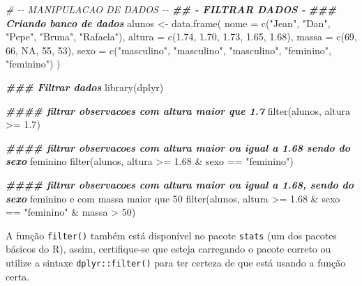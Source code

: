 \documentclass[
]{book}
\newenvironment{Shaded}{\begin{snugshade}}{\end{snugshade}}
\newcommand{\AttributeTok}[1]{\textcolor[rgb]{0.77,0.63,0.00}{#1}}
\newcommand{\CommentTok}[1]{\textcolor[rgb]{0.56,0.35,0.01}{\textit{#1}}}
\newcommand{\ConstantTok}[1]{\textcolor[rgb]{0.00,0.00,0.00}{#1}}
\newcommand{\DecValTok}[1]{\textcolor[rgb]{0.00,0.00,0.81}{#1}}
\newcommand{\DocumentationTok}[1]{\textcolor[rgb]{0.56,0.35,0.01}{\textbf{\textit{#1}}}}
\newcommand{\FloatTok}[1]{\textcolor[rgb]{0.00,0.00,0.81}{#1}}
\newcommand{\FunctionTok}[1]{\textcolor[rgb]{0.00,0.00,0.00}{#1}}
\newcommand{\NormalTok}[1]{#1}
\newcommand{\OtherTok}[1]{\textcolor[rgb]{0.56,0.35,0.01}{#1}}
\newcommand{\SpecialCharTok}[1]{\textcolor[rgb]{0.00,0.00,0.00}{#1}}
\newcommand{\StringTok}[1]{\textcolor[rgb]{0.31,0.60,0.02}{#1}}
\begin{document}
\begin{Shaded}
\begin{Highlighting}[]
\CommentTok{\# {-}{-} MANIPULACAO DE DADOS {-}{-}}
\DocumentationTok{\#\# {-} FILTRAR DADOS {-}}
\DocumentationTok{\#\#\# Criando banco de dados}
\NormalTok{alunos }\OtherTok{\textless{}{-}} \FunctionTok{data.frame}\NormalTok{(}
\AttributeTok{nome =} \FunctionTok{c}\NormalTok{(}\StringTok{"Jean"}\NormalTok{, }\StringTok{"Dan"}\NormalTok{, }\StringTok{"Pepe"}\NormalTok{, }\StringTok{"Bruna"}\NormalTok{, }\StringTok{"Rafaela"}\NormalTok{),}
\AttributeTok{altura =} \FunctionTok{c}\NormalTok{(}\FloatTok{1.74}\NormalTok{, }\FloatTok{1.70}\NormalTok{, }\FloatTok{1.73}\NormalTok{, }\FloatTok{1.65}\NormalTok{, }\FloatTok{1.68}\NormalTok{),}
\AttributeTok{massa =} \FunctionTok{c}\NormalTok{(}\DecValTok{69}\NormalTok{, }\DecValTok{66}\NormalTok{, }\ConstantTok{NA}\NormalTok{, }\DecValTok{55}\NormalTok{, }\DecValTok{53}\NormalTok{),}
\AttributeTok{sexo =} \FunctionTok{c}\NormalTok{(}\StringTok{"masculino"}\NormalTok{, }\StringTok{"masculino"}\NormalTok{, }\StringTok{"masculino"}\NormalTok{, }\StringTok{"feminino"}\NormalTok{, }\StringTok{"feminino"}\NormalTok{)}
\NormalTok{)}

\DocumentationTok{\#\#\# Filtrar dados}
\FunctionTok{library}\NormalTok{(dplyr)}

\DocumentationTok{\#\#\#\# filtrar observacoes com altura maior que 1.7}
\FunctionTok{filter}\NormalTok{(alunos, altura }\SpecialCharTok{\textgreater{}=} \FloatTok{1.7}\NormalTok{)}

\DocumentationTok{\#\#\#\# filtrar observacoes com altura maior ou igual a 1.68 sendo do sexo}
\NormalTok{feminino}
\FunctionTok{filter}\NormalTok{(alunos, altura }\SpecialCharTok{\textgreater{}=} \FloatTok{1.68} \SpecialCharTok{\&}\NormalTok{ sexo }\SpecialCharTok{==} \StringTok{"feminino"}\NormalTok{)}

\DocumentationTok{\#\#\#\# filtrar observacoes com altura maior ou igual a 1.68, sendo do sexo}
\NormalTok{feminino e com massa maior que }\DecValTok{50}
\FunctionTok{filter}\NormalTok{(alunos, altura }\SpecialCharTok{\textgreater{}=} \FloatTok{1.68} \SpecialCharTok{\&}\NormalTok{ sexo }\SpecialCharTok{==} \StringTok{"feminino"} \SpecialCharTok{\&}\NormalTok{ massa }\SpecialCharTok{\textgreater{}} \DecValTok{50}\NormalTok{)}
\end{Highlighting}
\end{Shaded}

A função \texttt{filter()} também está disponível no pacote \texttt{stats} (um dos pacotes básicos do R), assim, certifique-se que esteja carregando o pacote correto ou utilize a sintaxe \texttt{dplyr::filter()} para ter certeza de que está usando a função certa.
\end{document}
